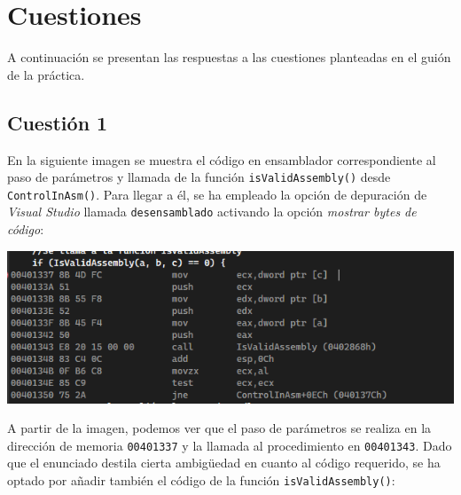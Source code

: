 \documentclass[11pt,a4paper]{article}
\begin{document}
\vspace{3ex}

\section{Cuestiones}
A continuación se presentan las respuestas a las cuestiones planteadas en el guión de la práctica. \vspace{2ex}

\subsection{Cuestión 1}
En la siguiente imagen se muestra el código en ensamblador correspondiente al paso de parámetros y llamada de la función \texttt{isValidAssembly()} desde \texttt{ControlInAsm()}. Para llegar a él, se ha empleado la opción de depuración de \textit{Visual Studio} llamada \texttt{desensamblado} activando la opción \textit{mostrar bytes de código}:\vspace{2ex}
\begin{center}
  \includegraphics[width=1\textwidth]{pasoParametrosCodigo.png}
\end{center}
\vspace{3ex}

\noindent A partir de la imagen, podemos ver que el paso de parámetros se realiza en la dirección de memoria \texttt{00401337} y la llamada al procedimiento en \texttt{00401343}. Dado que el enunciado destila cierta ambigüedad en cuanto al código requerido, se ha optado por añadir también el código de la función \texttt{isValidAssembly()}: \vspace{2ex}
\end{document}
